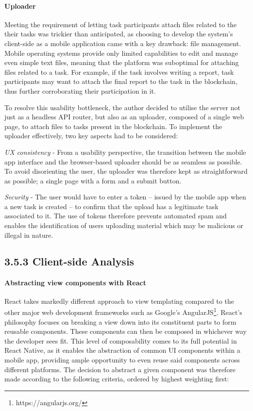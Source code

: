 \paragraph{Uploader}\label{uploader}

Meeting the requirement of letting task participants attach files
related to the their tasks was trickier than anticipated, as choosing to
develop the system's client-side as a mobile application came with a key
drawback: file management. Mobile operating systems provide only limited
capabilities to edit and manage even simple text files, meaning that the
platform was suboptimal for attaching files related to a task. For
example, if the task involves writing a report, task participants may
want to attach the final report to the task in the blockchain, thus
further corroborating their participation in it.

To resolve this usability bottleneck, the author decided to utilise the
server not just as a headless API router, but also as an uploader,
composed of a single web page, to attach files to tasks present in the
blockchain. To implement the uploader effectively, two key aspects had
to be considered:

\emph{UX consistency} - From a usability perspective, the transition
between the mobile app interface and the browser-based uploader should
be as seamless as possible. To avoid disorienting the user, the uploader
was therefore kept as straightforward as possible; a single page with a
form and a submit button.

\emph{Security} - The user would have to enter a token -- issued by the
mobile app when a new task is created -- to confirm that the upload has
a legitimate task associated to it. The use of tokens therefore prevents
automated spam and enables the identification of users uploading
material which may be malicious or illegal in nature.

\subsection{3.5.3 Client-side Analysis}\label{client-side-analysis}

\paragraph{Abstracting view components with
React}\label{abstracting-view-components-with-react}

React takes markedly different approach to view templating compared to
the other major web development frameworks such as Google's
AngularJS\footnote{https://angularjs.org/}. React's philosophy
focuses on breaking a view down into its constituent parts to form
reusable components. These components can then be composed in whichever
way the developer sees fit. This level of composability comes to its
full potential in React Native, as it enables the abstraction of common
UI components within a mobile app, providing ample opportunity to even
reuse said components across different platforms. The decision to
abstract a given component was therefore made according to the following
criteria, ordered by highest weighting first:

